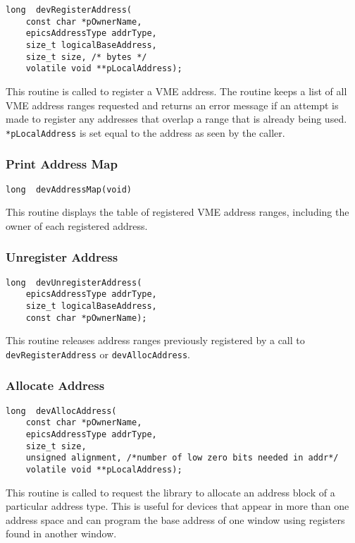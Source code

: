 \begin{verbatim}
long  devRegisterAddress(
    const char *pOwnerName,
    epicsAddressType addrType,
    size_t logicalBaseAddress,
    size_t size, /* bytes */
    volatile void **pLocalAddress);
\end{verbatim}

This routine is called to register a VME address. The routine keeps a list of all VME address ranges requested and returns 
an error message if an attempt is made to register any addresses that overlap a range that is already being used. 
\verb|*pLocalAddress| is set equal to the address as seen by the caller.

\subsubsection{Print Address Map}

\begin{verbatim}
long  devAddressMap(void)
\end{verbatim}

This routine displays the table of registered VME address ranges, including the owner of each registered address.

\subsubsection{Unregister Address}

\begin{verbatim}
long  devUnregisterAddress(
    epicsAddressType addrType,
    size_t logicalBaseAddress,
    const char *pOwnerName);
\end{verbatim}

This routine releases address ranges previously registered by a call to \verb|devRegisterAddress| or \verb|devAllocAddress|.

\subsubsection{Allocate Address}

\begin{verbatim}
long  devAllocAddress(
    const char *pOwnerName,
    epicsAddressType addrType,
    size_t size,
    unsigned alignment, /*number of low zero bits needed in addr*/
    volatile void **pLocalAddress);
\end{verbatim}

This routine is called to request the library to allocate an address block of a particular address type. This is useful for 
devices that appear in more than one address space and can program the base address of one window using registers found 
in another window.

